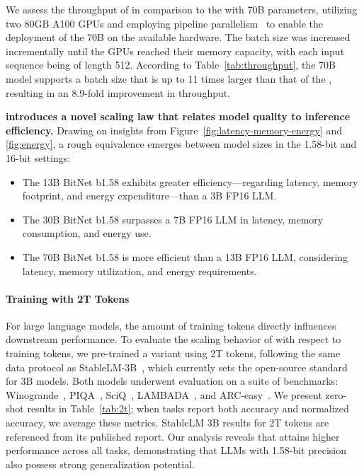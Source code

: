 We assess the throughput of  in comparison to the  with 70B parameters, utilizing two 80GB A100 GPUs and employing pipeline parallelism~\cite{gpipe} to enable the deployment of the  70B on the available hardware. The batch size was increased incrementally until the GPUs reached their memory capacity, with each input sequence being of length 512. According to Table~\ref{tab:throughput}, the  70B model supports a batch size that is up to 11 times larger than that of the , resulting in an 8.9-fold improvement in throughput.

\textbf{ introduces a novel scaling law that relates model quality to inference efficiency.} Drawing on insights from Figure~\ref{fig:latency-memory-energy} and \ref{fig:energy}, a rough equivalence emerges between model sizes in the 1.58-bit and 16-bit settings:

\begin{itemize}
    \item The 13B BitNet b1.58 exhibits greater efficiency—regarding latency, memory footprint, and energy expenditure—than a 3B FP16 LLM.
    \item The 30B BitNet b1.58 surpasses a 7B FP16 LLM in latency, memory consumption, and energy use.
    \item The 70B BitNet b1.58 is more efficient than a 13B FP16 LLM, considering latency, memory utilization, and energy requirements.
\end{itemize}

\paragraph{Training with 2T Tokens}

For large language models, the amount of training tokens directly influences downstream performance. To evaluate the scaling behavior of  with respect to training tokens, we pre-trained a  variant using 2T tokens, following the same data protocol as StableLM-3B~\cite{StableLM-3B-4E1T}, which currently sets the open-source standard for 3B models. Both models underwent evaluation on a suite of benchmarks: Winogrande~\cite{winoGrande}, PIQA~\cite{piqa}, SciQ~\cite{sciq}, LAMBADA~\cite{lambada}, and ARC-easy~\cite{arc}. We present zero-shot results in Table~\ref{tab:2t}; when tasks report both accuracy and normalized accuracy, we average these metrics. StableLM 3B results for 2T tokens are referenced from its published report. Our analysis reveals that  attains higher performance across all tasks, demonstrating that LLMs with 1.58-bit precision also possess strong generalization potential.

